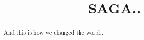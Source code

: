 \documentclass[10pt,letterpaper]{article}
\begin{document}
\title{SAGA..} 


\begin{abstract}
  And this is how we changed the world..

\end{abstract}

\maketitle
\end{document}
